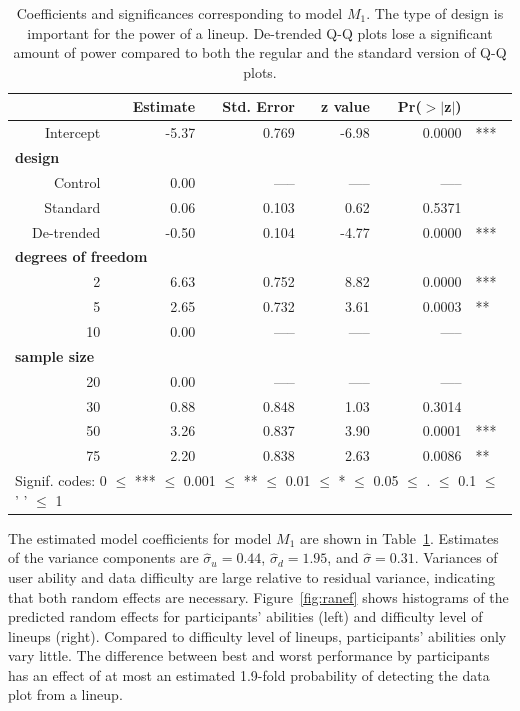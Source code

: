 \documentclass{article}\usepackage[]{graphicx}\usepackage[]{color}
\begin{document}
\begin{table}[ht]
\centering
\caption{\label{tab:model} Coefficients and significances corresponding to  model $M_1$. The type of design is important for the power of a lineup. De-trended Q-Q plots lose a significant amount of power compared to both the regular and the standard version of Q-Q plots. }
\begin{tabular}{rrrrrl}
  \hline
 &\bf Estimate &\bf Std. Error &\bf z value &\bf Pr($>$$|$z$|$) & \\ 
  \hline
  Intercept &  -5.37 & 0.769 & -6.98 & 0.0000  & *** \\ [3pt]
\multicolumn{3}{l}{\bf design} \\
   Control & 0.00 & ----- & ----- & ----- \\ 
   Standard & 0.06 & 0.103 & 0.62 & 0.5371 \\
   De-trended & -0.50 & 0.104 & -4.77 & 0.0000 & ***\\  [3pt]
\multicolumn{4}{l}{\bf degrees of freedom} \\
  2 & 6.63 & 0.752 & 8.82 & 0.0000 & ***\\ 
  5 & 2.65 & 0.732 & 3.61 & 0.0003 & **\\ 
  10 & 0.00 & ----- & ----- & ----- \\ [3pt]
\multicolumn{3}{l}{\bf sample size} \\
  20 & 0.00 & ----- & ----- & ----- \\ 
  30 & 0.88 & 0.848 & 1.03 & 0.3014 \\ 
  50  & 3.26 & 0.837 & 3.90 & 0.0001 & ***\\ 
  75 & 2.20 & 0.838 & 2.63 & 0.0086  & **\\ 
   \hline
\multicolumn{6}{l}{Signif. codes:  0 $\le$ *** $\le$ 0.001 $\le$ ** $\le$ 0.01 $\le$ * $\le$ 0.05 $\le$ . $\le$ 0.1 $\le$ ' ' $\le$ 1}
\end{tabular}
\end{table}

The estimated model coefficients for model $M_1$ are shown in Table~\ref{tab:model}. 
Estimates of the variance components are $\widehat{\sigma}_u = 0.44$, $\widehat{\sigma}_d=1.95$, and $\widehat{\sigma} = 0.31$. Variances of user ability and data difficulty are large relative to residual variance, indicating that both random effects are necessary.
%
Figure~\ref{fig:ranef} shows histograms of the predicted random effects for participants' abilities (left) and difficulty level of lineups (right). Compared to difficulty level of lineups, participants' abilities only vary little. The difference between best and worst performance by participants has an effect of at most an estimated 
1.9-fold probability of detecting the data plot from a lineup. 
\end{document}
